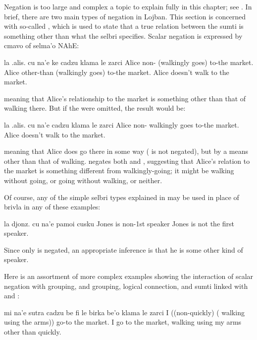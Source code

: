 Negation is too large and complex a topic to explain fully
    in this chapter; see . In
    brief, there are two main types of negation in Lojban. This
    section is concerned with so-called , which
    is used to state that a true relation between the sumti is
    something other than what the selbri specifies. Scalar negation
    is expressed by cmavo of selma'o NAhE:
\begin{example}
la .alis. cu na'e ke cadzu klama  le zarci\n
Alice non- (walkingly goes) to-the market.\n
Alice other-than (walkingly goes) to-the market.\n
Alice doesn't walk to the market.
\end{example}

{\noindent}meaning that Alice's relationship to the market is something
    other than that of walking there. But if the  were
    omitted, the result would be:
\begin{example}
la .alis. cu na'e cadzu klama le zarci\n
Alice non- walkingly goes to-the market.\n
Alice doesn't walk to the market.
\end{example}

{\noindent}meaning that Alice does go there in some way ( is not
    negated), but by a means other than that of walking.  negates both  and
    , suggesting that Alice's relation to the market is
    something different from walkingly-going; it might be walking
    without going, or going without walking, or neither. 

Of course, any of the simple selbri types explained in  may be used in place of brivla in any
    of these examples:
\begin{example}
la djonz. cu na'e pamoi cusku\n
Jones is non-1st speaker\n
Jones is not the first speaker.
\end{example}

Since only  is negated, an appropriate inference is
    that he is some other kind of speaker.

Here is an assortment of more complex examples showing the
    interaction of scalar negation with  grouping,  and
     grouping, logical connection, and sumti linked with
     and :
\begin{example}
mi na'e sutra cadzu be fi le birka be'o\n
\T	klama le zarci\n
I ((non-quickly) ( walking using the arms))\n
\T	go-to the market.\n
I go to the market, walking using my arms\n
\T	other than quickly.
\end{example}

